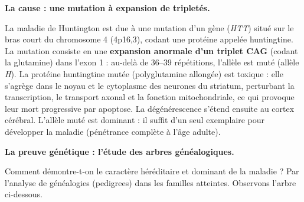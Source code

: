 \documentclass[11pt]{article}
\newcommand{\cle}[1]{{\popxbold\color{popdark}#1}}
\begin{document}
\textbf{La cause : une mutation à expansion de tripletés.}\par

La maladie de Huntington est due à une \cle{mutation} d'un gène (\emph{HTT}) situé sur le bras court du chromosome 4 (4p16,3), codant une protéine appelée \cle{huntingtine}. La mutation consiste en une \textbf{expansion anormale d'un triplet CAG} (codant la glutamine) dans l'exon 1 : au-delà de 36--39 répétitions, l'allèle est muté (allèle \emph{H}). La protéine huntingtine mutée (polyglutamine allongée) est toxique : elle s'agrège dans le noyau et le cytoplasme des neurones du striatum, perturbant la transcription, le transport axonal et la fonction mitochondriale, ce qui provoque leur mort progressive par apoptose. La dégénérescence s'étend ensuite au cortex cérébral. L'allèle muté est \cle{dominant} : il suffit d'un seul exemplaire pour développer la maladie (pénétrance complète à l'âge adulte).

\textbf{La preuve génétique : l'étude des arbres généalogiques.}\par

Comment démontre-t-on le caractère héréditaire et dominant de la maladie ? Par l'\cle{analyse de généalogies} (pedigrees) dans les familles atteintes. Observons l'arbre ci-dessous.
\end{document}
